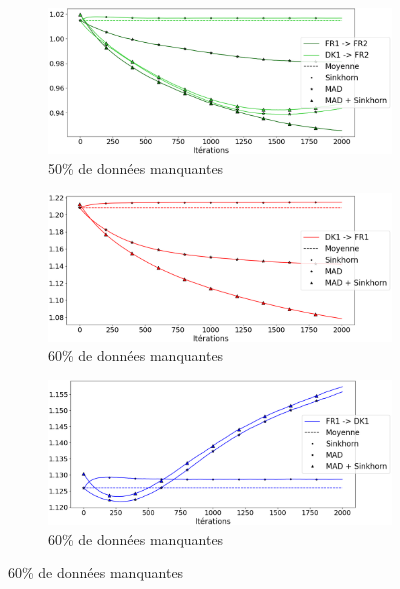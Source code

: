 \documentclass[acmsmall, natbib=false, nonacm]{acmart}
\begin{document}
\begin{figure}[H]
    \centering
    \begin{subfigure}[b]{0.4\textwidth}
        \centering
        \includegraphics[scale=0.14]{images/50_biais_FR2.png}
        \caption{50\% de données manquantes}
        \label{50_biais_FR2}
    \end{subfigure}
    \hfill
    \begin{subfigure}[b]{0.4\textwidth}
        \centering
        \includegraphics[scale=0.14]{images/60_biais_FR1.png}
        \caption{60\% de données manquantes}
        \label{60_biais_FR1}
    \end{subfigure}
    \hfill
    \begin{subfigure}[b]{0.4\textwidth}
        \centering
        \includegraphics[scale=0.14]{images/60_biais_DK1.png}
        \caption{60\% de données manquantes}
        \label{60_biais_DK1}

\end{subfigure}
\end{figure}
\end{document}
